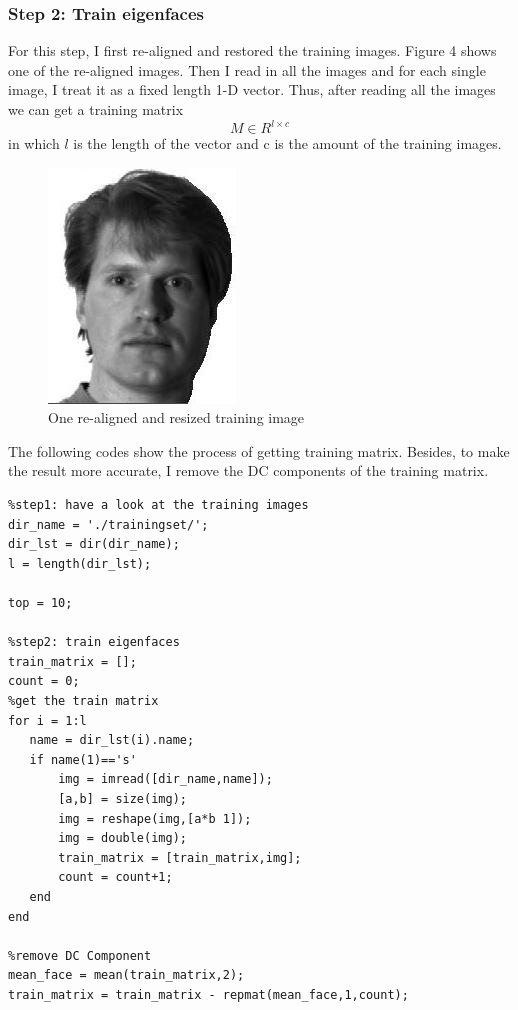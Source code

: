 \documentclass{article}
\begin{document}
\subsubsection*{Step 2: Train eigenfaces}
For this step, I first re-aligned and restored the training images. Figure 4 shows one of the re-aligned images. Then I read in all the images and for each single image, I treat it as a fixed length 1-D vector. Thus, after reading all the images we can get a training matrix
$$M\in R^{l\times c}$$ 
in which $l$ is the length of the vector and c is the amount of the training images. 

\begin{figure}[htbp]
    \centering
    \includegraphics[scale = 0.4]{train_02.jpg}
    \caption{One re-aligned and resized training image}
    \label{fig4}
\end{figure}

The following codes show the process of getting training matrix. Besides, to make the result more accurate, I remove the DC components of the training matrix.

\begin{lstlisting}
%step1: have a look at the training images
dir_name = './trainingset/';
dir_lst = dir(dir_name);
l = length(dir_lst);

top = 10;

%step2: train eigenfaces
train_matrix = [];
count = 0;
%get the train matrix
for i = 1:l
   name = dir_lst(i).name;
   if name(1)=='s'
       img = imread([dir_name,name]);
       [a,b] = size(img);
       img = reshape(img,[a*b 1]);
       img = double(img);
       train_matrix = [train_matrix,img];
       count = count+1;
   end
end

%remove DC Component
mean_face = mean(train_matrix,2);
train_matrix = train_matrix - repmat(mean_face,1,count);

\end{lstlisting}
\end{document}
